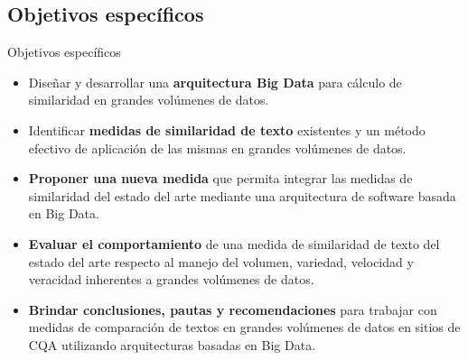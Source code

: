 \subsection{Objetivos específicos}
\begin{frame}{Objetivos específicos}
	\begin{tcolorbox}[colback=blue!5,colframe=blue!40!black,title=Objetivos específicos]
		\begin{footnotesize}
			\begin{itemize} [<+>]
				\item Diseñar y desarrollar una \textbf{arquitectura Big Data} para cálculo de similaridad en grandes volúmenes de datos.
				\item Identificar \textbf{medidas de similaridad de texto} existentes y un método efectivo de aplicación de las mismas en grandes volúmenes de datos.
				\item \textbf{Proponer una nueva medida} que permita integrar las medidas de similaridad del estado del arte mediante una arquitectura de software basada en Big Data.
				\item \textbf{Evaluar el comportamiento} de una medida de similaridad de texto del estado del arte respecto al manejo del volumen, variedad, velocidad y veracidad inherentes a grandes volúmenes de datos.
				\item \textbf{Brindar conclusiones, pautas y recomendaciones} para trabajar con medidas de comparación de textos en grandes volúmenes de datos en sitios de CQA utilizando arquitecturas basadas en Big Data.
			\end{itemize}
		\end{footnotesize}
	\end{tcolorbox}
\end{frame}